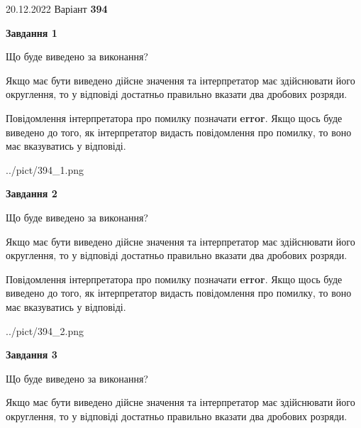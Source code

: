 \documentclass[12pt, ukrainian]{article}
\begin{document}
{20.12.2022 Варіант \No \textbf { 394 }\par}
{
\begin {Large}

{\begin {center}\textbf{Завдання 1}\end {center}}\par
Що буде виведено за виконання? \par

Якщо має бути виведено дійсне значення та інтерпретатор має здійснювати його округлення, 
то у відповіді достатньо правильно вказати два дробових розряди.

Повідомлення інтерпретатора про помилку позначати \textbf{error}.
Якщо щось буде виведено до того, як інтерпретатор видасть повідомлення про помилку, 
то воно має вказуватись у відповіді. \par

\begin{center}
	{../pict/394_1.png}
\end{center}
\newpage

{\begin {center}\textbf{Завдання 2}\end {center}}\par
Що буде виведено за виконання? \par

Якщо має бути виведено дійсне значення та інтерпретатор має здійснювати його округлення, 
то у відповіді достатньо правильно вказати два дробових розряди.

Повідомлення інтерпретатора про помилку позначати \textbf{error}.
Якщо щось буде виведено до того, як інтерпретатор видасть повідомлення про помилку, 
то воно має вказуватись у відповіді. \par

\begin{center}
	{../pict/394_2.png}
\end{center}
\newpage

{\begin {center}\textbf{Завдання 3}\end {center}}\par
Що буде виведено за виконання? \par

Якщо має бути виведено дійсне значення та інтерпретатор має здійснювати його округлення, 
то у відповіді достатньо правильно вказати два дробових розряди.


\end{Large}}
\end{document}
